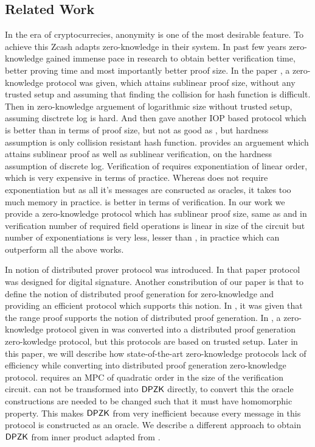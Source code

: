 \subsection{Related Work}

In the era of cryptocurrecies, anonymity is one of the most desirable feature. To achieve this Zcash adapts zero-knowledge in their system. In past few years zero-knowledge gained immense pace in research to obtain better verification time, better proving time and most importantly better proof size. In the paper \cite{Ligero2017}, a zero-knowledge protocol was given, which attains sublinear proof size, without any trusted setup and assuming that finding the collision for hash function is difficult. Then in \cite{Bulletproofs} zero-knowledge arguement of logarithmic size without trusted setup, assuming disctrete log is hard. And then \cite{Aurora} gave another IOP based protocol which is better than \cite{Ligero2017} in terms of proof size, but not as good as \cite{Bulletproofs}, but hardness assumption is only collision resistant hash function. \cite{spartan} provides an arguement which attains sublinear proof as well as sublinear verification, on the hardness assumption of discrete log. Verification of \cite{Bulletproofs} requires exponentiation of linear order, which is very expensive in terms of practice. Whereas \cite{Aurora} does not require exponentiation but as all it's messages are consructed as oracles, it takes too much memory in practice. \cite{spartan} is better in terms of verification. In our work we provide a zero-knowledge protocol which has sublinear proof size, same as \cite{spartan} and in verification number of required field operations is linear in size of the circuit but number of exponentiations is very less, lesser than \cite{spartan}, in practice which can outperform all the above works.

In \cite{DDS} notion of distributed prover protocol was introduced. In that paper protocol was designed for digital signature. Another constribution of our paper is that to define the notion of distributed proof generation for zero-knowledge and providing an efficient protocol which supports this notion. In \cite{Bulletproofs}, it was given that the range proof supports the notion of distributed proof generation. In \cite{Trinocchio}, a zero-knowledge protocol given in \cite{pinnochio_PHGR} was converted into a distributed proof generation zero-kowledge protocol, but this protocols are based on trusted setup. Later in this paper, we will describe how state-of-the-art zero-knowledge protocols lack of efficiency while converting into distributed proof generation zero-knowledge protocol. \cite{spartan} requires an MPC of quadratic order in the size of the verification circuit. \cite{Ligero2017, Aurora} can not be transformed into $\mathsf{DPZK}$ directly, to convert this the oracle constructions are needed to be changed such that it must have homomorphic property. This makes $\mathsf{DPZK}$ from \cite{Aurora} very inefficient because every message in this protocol is constructed as an oracle. We describe a different approach to obtain $\mathsf{DPZK}$ from inner product adapted from \cite{Bulletproofs}.